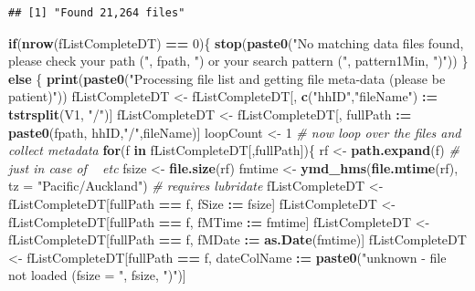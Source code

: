 \documentclass[]{article}
\newenvironment{Shaded}{\begin{snugshade}}{\end{snugshade}}
\newcommand{\KeywordTok}[1]{\textcolor[rgb]{0.13,0.29,0.53}{\textbf{#1}}}
\newcommand{\DataTypeTok}[1]{\textcolor[rgb]{0.13,0.29,0.53}{#1}}
\newcommand{\DecValTok}[1]{\textcolor[rgb]{0.00,0.00,0.81}{#1}}
\newcommand{\StringTok}[1]{\textcolor[rgb]{0.31,0.60,0.02}{#1}}
\newcommand{\CommentTok}[1]{\textcolor[rgb]{0.56,0.35,0.01}{\textit{#1}}}
\newcommand{\ControlFlowTok}[1]{\textcolor[rgb]{0.13,0.29,0.53}{\textbf{#1}}}
\newcommand{\OperatorTok}[1]{\textcolor[rgb]{0.81,0.36,0.00}{\textbf{#1}}}
\newcommand{\ErrorTok}[1]{\textcolor[rgb]{0.64,0.00,0.00}{\textbf{#1}}}
\newcommand{\NormalTok}[1]{#1}
\begin{document}
\begin{verbatim}
## [1] "Found 21,264 files"
\end{verbatim}

\begin{Shaded}
\begin{Highlighting}[]
\ControlFlowTok{if}\NormalTok{(}\KeywordTok{nrow}\NormalTok{(fListCompleteDT) }\OperatorTok{==}\StringTok{ }\DecValTok{0}\NormalTok{)\{}
  \KeywordTok{stop}\NormalTok{(}\KeywordTok{paste0}\NormalTok{(}\StringTok{"No matching data files found, please check your path ("}\NormalTok{, fpath, }\StringTok{") or your search pattern ("}\NormalTok{, pattern1Min, }\StringTok{")"}\NormalTok{))}
\NormalTok{\} }\ControlFlowTok{else}\NormalTok{ \{}
  \KeywordTok{print}\NormalTok{(}\KeywordTok{paste0}\NormalTok{(}\StringTok{"Processing file list and getting file meta-data (please be patient)"}\NormalTok{))}
\NormalTok{  fListCompleteDT <-}\StringTok{ }\NormalTok{fListCompleteDT[, }\KeywordTok{c}\NormalTok{(}\StringTok{"hhID"}\NormalTok{,}\StringTok{"fileName"}\NormalTok{) }\OperatorTok{:}\ErrorTok{=}\StringTok{ }\KeywordTok{tstrsplit}\NormalTok{(V1, }\StringTok{"/"}\NormalTok{)]}
\NormalTok{  fListCompleteDT <-}\StringTok{ }\NormalTok{fListCompleteDT[, fullPath }\OperatorTok{:}\ErrorTok{=}\StringTok{ }\KeywordTok{paste0}\NormalTok{(fpath, hhID,}\StringTok{"/"}\NormalTok{,fileName)]}
\NormalTok{  loopCount <-}\StringTok{ }\DecValTok{1}
  \CommentTok{# now loop over the files and collect metadata}
  \ControlFlowTok{for}\NormalTok{(f }\ControlFlowTok{in}\NormalTok{ fListCompleteDT[,fullPath])\{}
\NormalTok{    rf <-}\StringTok{ }\KeywordTok{path.expand}\NormalTok{(f) }\CommentTok{# just in case of ~ etc}
\NormalTok{    fsize <-}\StringTok{ }\KeywordTok{file.size}\NormalTok{(rf)}
\NormalTok{    fmtime <-}\StringTok{ }\KeywordTok{ymd_hms}\NormalTok{(}\KeywordTok{file.mtime}\NormalTok{(rf), }\DataTypeTok{tz =} \StringTok{"Pacific/Auckland"}\NormalTok{) }\CommentTok{# requires lubridate}
\NormalTok{    fListCompleteDT <-}\StringTok{ }\NormalTok{fListCompleteDT[fullPath }\OperatorTok{==}\StringTok{ }\NormalTok{f, fSize }\OperatorTok{:}\ErrorTok{=}\StringTok{ }\NormalTok{fsize]}
\NormalTok{    fListCompleteDT <-}\StringTok{ }\NormalTok{fListCompleteDT[fullPath }\OperatorTok{==}\StringTok{ }\NormalTok{f, fMTime }\OperatorTok{:}\ErrorTok{=}\StringTok{ }\NormalTok{fmtime]}
\NormalTok{    fListCompleteDT <-}\StringTok{ }\NormalTok{fListCompleteDT[fullPath }\OperatorTok{==}\StringTok{ }\NormalTok{f, fMDate }\OperatorTok{:}\ErrorTok{=}\StringTok{ }\KeywordTok{as.Date}\NormalTok{(fmtime)]}
\NormalTok{    fListCompleteDT <-}\StringTok{ }\NormalTok{fListCompleteDT[fullPath }\OperatorTok{==}\StringTok{ }\NormalTok{f, dateColName }\OperatorTok{:}\ErrorTok{=}\StringTok{ }\KeywordTok{paste0}\NormalTok{(}\StringTok{"unknown - file not loaded (fsize = "}\NormalTok{, fsize, }\StringTok{")"}\NormalTok{)]}

\end{Highlighting}
\end{Shaded}
\end{document}
